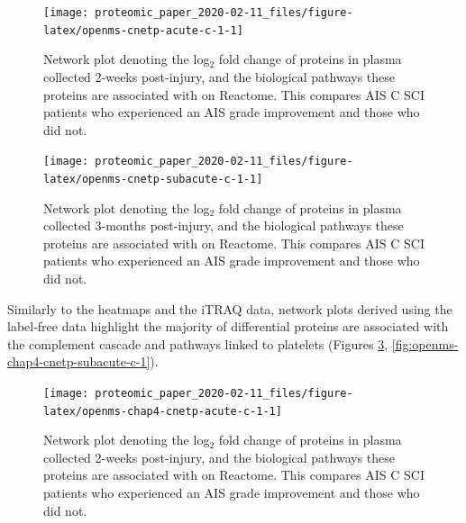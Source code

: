 \documentclass[9pt,lineno]{elife}
\newcommand{\blandscape}{\begin{landscape}}
\newcommand{\elandscape}{\end{landscape}}
\begin{document}
\begin{landscape}
\begin{landscape}



\begin{figure}

{\centering \texttt{[image: proteomic\_paper\_2020-02-11\_files/figure-latex/openms-cnetp-acute-c-1-1]} 

}

\caption{Network plot denoting the log\(_2\) fold change of proteins in plasma collected 2-weeks post-injury, and the biological pathways these proteins are associated with on Reactome. This compares AIS C SCI patients who experienced an AIS grade improvement and those who did not.}\label{fig:openms-cnetp-acute-c-1}
\end{figure}

\elandscape
\blandscape



\begin{figure}

{\centering \texttt{[image: proteomic\_paper\_2020-02-11\_files/figure-latex/openms-cnetp-subacute-c-1-1]} 

}

\caption{Network plot denoting the log\(_2\) fold change of proteins in plasma collected 3-months post-injury, and the biological pathways these proteins are associated with on Reactome. This compares AIS C SCI patients who experienced an AIS grade improvement and those who did not.}\label{fig:openms-cnetp-subacute-c-1}
\end{figure}

\end{landscape}

\clearpage

Similarly to the heatmaps and the iTRAQ data, network plots derived using the label-free data highlight the majority of differential proteins are associated with the complement cascade and pathways linked to platelets (Figures \ref{fig:openms-chap4-cnetp-acute-c-1}, \ref{fig:openms-chap4-cnetp-subacute-c-1}).

\begin{landscape}



\begin{figure}

{\centering \texttt{[image: proteomic\_paper\_2020-02-11\_files/figure-latex/openms-chap4-cnetp-acute-c-1-1]} 

}

\caption{Network plot denoting the log\(_2\) fold change of proteins in plasma collected 2-weeks post-injury, and the biological pathways these proteins are associated with on Reactome. This compares AIS C SCI patients who experienced an AIS grade improvement and those who did not.}\label{fig:openms-chap4-cnetp-acute-c-1}
\end{figure}


\end{landscape}
\end{landscape}
\end{document}
